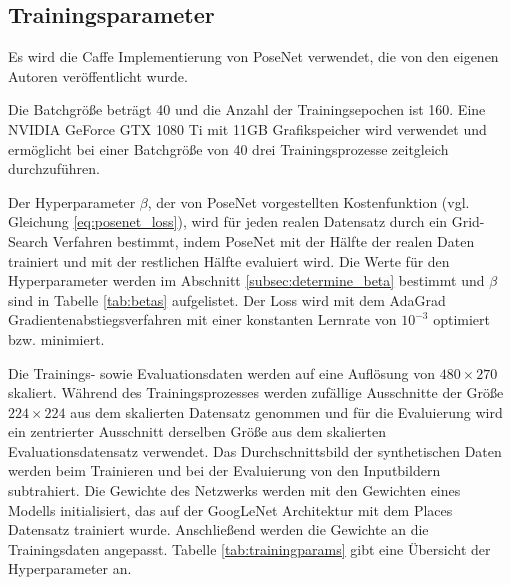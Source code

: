 \subsection{Trainingsparameter}
Es wird die Caffe \cite{jiaCaffeConvolutionalArchitecture2014} Implementierung von PoseNet verwendet, die von den eigenen Autoren \citet{kendallPoseNetConvolutionalNetwork2015} veröffentlicht wurde.

Die Batchgröße beträgt 40 und die Anzahl der Trainingsepochen ist 160. Eine NVIDIA GeForce GTX 1080 Ti mit 11GB Grafikspeicher wird verwendet und ermöglicht bei einer Batchgröße von 40 drei Trainingsprozesse zeitgleich durchzuführen.

Der Hyperparameter $\beta$, der von PoseNet vorgestellten Kostenfunktion (vgl. Gleichung \ref{eq:posenet_loss}), wird für jeden realen Datensatz durch ein Grid-Search Verfahren bestimmt, indem PoseNet mit der Hälfte der realen Daten trainiert und mit der restlichen Hälfte evaluiert wird. Die Werte für den Hyperparameter werden im Abschnitt \ref{subsec:determine_beta} bestimmt und $\beta$ sind in Tabelle \ref{tab:betas} aufgelistet. Der Loss wird mit dem AdaGrad \cite{duchiAdaptiveSubgradientMethods2011} Gradientenabstiegsverfahren mit einer konstanten Lernrate von $10^{-3}$ optimiert bzw. minimiert. 

Die Trainings- sowie Evaluationsdaten werden auf eine Auflösung von $480\times270$ skaliert. Während des Trainingsprozesses werden zufällige Ausschnitte der Größe $224 \times 224$ aus dem skalierten Datensatz genommen und für die Evaluierung wird ein zentrierter Ausschnitt derselben Größe aus dem skalierten Evaluationsdatensatz verwendet. Das Durchschnittsbild der synthetischen Daten werden beim Trainieren und bei der Evaluierung von den Inputbildern subtrahiert.
Die Gewichte des Netzwerks werden mit den Gewichten eines Modells initialisiert, das auf der GoogLeNet Architektur mit dem Places Datensatz \cite{zhouLearningDeepFeatures2014} trainiert wurde. Anschließend werden die Gewichte an die Trainingsdaten angepasst. Tabelle \ref{tab:trainingparams} gibt eine Übersicht der Hyperparameter an.

